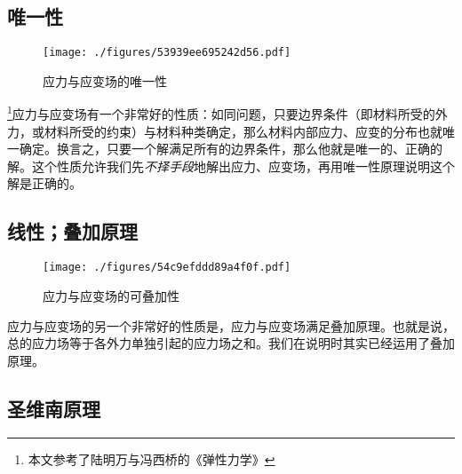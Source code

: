 
\begin{issues}
\issueDraft
\end{issues}


\subsection{唯一性}
\begin{figure}[ht]
\centering
\texttt{[image: ./figures/53939ee695242d56.pdf]}
\caption{应力与应变场的唯一性} \label{fig_SSPRN_1}
\end{figure}
\footnote{本文参考了陆明万与冯西桥的《弹性力学》}应力与应变场有一个非常好的性质：如同问题，只要边界条件（即材料所受的外力，或材料所受的约束）与材料种类确定，那么材料内部应力、应变的分布也就唯一确定。换言之，只要一个解满足所有的边界条件，那么他就是唯一的、正确的解。这个性质允许我们先\textsl{不择手段}地解出应力、应变场，再用唯一性原理说明这个解是正确的。

\subsection{线性；叠加原理}
\begin{figure}[ht]
\centering
\texttt{[image: ./figures/54c9efddd89a4f0f.pdf]}
\caption{应力与应变场的可叠加性} \label{fig_SSPRN_2}
\end{figure}
应力与应变场的另一个非常好的性质是，应力与应变场满足叠加原理。也就是说，总的应力场等于各外力单独引起的应力场之和。我们在说明时其实已经运用了叠加原理。%

\subsection{圣维南原理}
